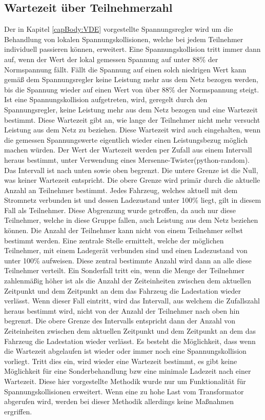 \subsection{Wartezeit über Teilnehmerzahl}
\label{cap:background_sec:SA_participants}
Der in Kapitel \ref{capBody:VDE} vorgestellte Spannungsregler wird um die Behandlung von lokalen Spannungskollisionen, welche bei jedem Teilnehmer individuell passieren können, erweitert. Eine Spannungskollision tritt immer dann auf, wenn der Wert der lokal gemessen Spannung auf unter 88\% der Normspannung fällt. Fällt die Spannung auf einen solch niedrigen Wert kann gemäß dem Spannungsregler keine Leistung mehr aus dem Netz bezogen werden, bis die Spannung wieder auf einen Wert von über 88\% der Normspannung steigt. Ist eine Spannungskollision aufgetreten, wird, geregelt durch den Spannungsregler, keine Leistung mehr aus dem Netz bezogen und eine Wartezeit bestimmt. Diese Wartezeit gibt an, wie lange der Teilnehmer nicht mehr versucht Leistung aus dem Netz zu beziehen. Diese Wartezeit wird auch eingehalten, wenn die gemessen Spannungswerte eigentlich wieder einen Leistungsbezug möglich machen würden. Der Wert der Wartezeit werden per Zufall aus einem Intervall heraus bestimmt, unter Verwendung eines Mersenne-Twister(python-random). Das Intervall ist nach unten sowie oben begrenzt. Die untere Grenze ist die Null, was keiner Wartezeit entspricht. Die obere Grenze wird primär durch die aktuelle Anzahl an Teilnehmer bestimmt. Jedes Fahrzeug, welches aktuell mit dem Stromnetz verbunden ist und dessen Ladezustand unter 100\% liegt, gilt in diesem Fall als Teilnehmer. Diese Abgrenzung wurde getroffen, da auch nur diese Teilnehmer, welche in diese Gruppe fallen, auch Leistung aus dem Netz beziehen können. Die Anzahl der Teilnehmer kann nicht von einem Teilnehmer selbst bestimmt werden. Eine zentrale Stelle ermittelt, welche der möglichen Teilnehmer, mit einem Ladegerät verbunden sind und einen Ladezustand von unter 100\% aufweisen. Diese zentral bestimmte Anzahl wird dann an alle diese Teilnehmer verteilt. Ein Sonderfall tritt ein, wenn die Menge der Teilnehmer zahlenmäßig höher ist als die Anzahl der Zeiteinheiten zwischen dem aktuellen Zeitpunkt und dem Zeitpunkt an dem das Fahrzeug die Ladestation wieder verlässt. Wenn dieser Fall eintritt, wird das Intervall, aus welchem die Zufallszahl heraus bestimmt wird, nicht von der Anzahl der Teilnehmer nach oben hin begrenzt. Die obere Grenze des Intervalls entspricht dann der Anzahl von Zeiteinheiten zwischen dem aktuellen Zeitpunkt und dem Zeitpunkt an dem das Fahrzeug die Ladestation wieder verlässt. Es besteht die Möglichkeit, dass wenn die Wartezeit abgelaufen ist wieder oder immer noch eine Spannungskollision vorliegt. Tritt dies ein, wird wieder eine Wartezeit bestimmt, es gibt keine Möglichkeit für eine Sonderbehandlung bzw eine minimale Ladezeit nach einer Wartezeit. Diese hier vorgestellte Methodik wurde nur um Funktionalität für Spannungskollisionen erweitert. Wenn eine zu hohe Last vom Transformator abgerufen wird, werden bei dieser Methodik allerdings keine Maßnahmen ergriffen.
